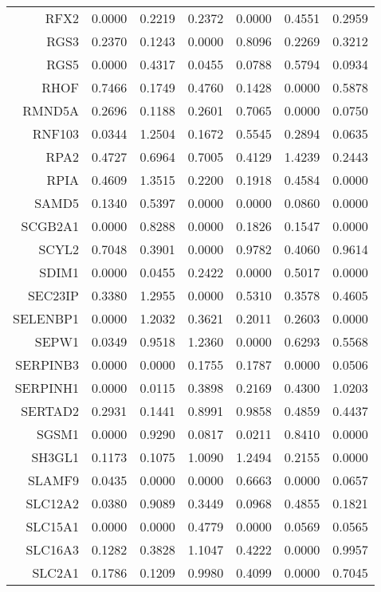 \begin{longtable}{rrrrrrr}
  RFX2 & 0.0000 & 0.2219 & 0.2372 & 0.0000 & 0.4551 & 0.2959 \\ 
  RGS3 & 0.2370 & 0.1243 & 0.0000 & 0.8096 & 0.2269 & 0.3212 \\ 
  RGS5 & 0.0000 & 0.4317 & 0.0455 & 0.0788 & 0.5794 & 0.0934 \\ 
  RHOF & 0.7466 & 0.1749 & 0.4760 & 0.1428 & 0.0000 & 0.5878 \\ 
  RMND5A & 0.2696 & 0.1188 & 0.2601 & 0.7065 & 0.0000 & 0.0750 \\ 
  RNF103 & 0.0344 & 1.2504 & 0.1672 & 0.5545 & 0.2894 & 0.0635 \\ 
  RPA2 & 0.4727 & 0.6964 & 0.7005 & 0.4129 & 1.4239 & 0.2443 \\ 
  RPIA & 0.4609 & 1.3515 & 0.2200 & 0.1918 & 0.4584 & 0.0000 \\ 
  SAMD5 & 0.1340 & 0.5397 & 0.0000 & 0.0000 & 0.0860 & 0.0000 \\ 
  SCGB2A1 & 0.0000 & 0.8288 & 0.0000 & 0.1826 & 0.1547 & 0.0000 \\ 
  SCYL2 & 0.7048 & 0.3901 & 0.0000 & 0.9782 & 0.4060 & 0.9614 \\ 
  SDIM1 & 0.0000 & 0.0455 & 0.2422 & 0.0000 & 0.5017 & 0.0000 \\ 
  SEC23IP & 0.3380 & 1.2955 & 0.0000 & 0.5310 & 0.3578 & 0.4605 \\ 
  SELENBP1 & 0.0000 & 1.2032 & 0.3621 & 0.2011 & 0.2603 & 0.0000 \\ 
  SEPW1 & 0.0349 & 0.9518 & 1.2360 & 0.0000 & 0.6293 & 0.5568 \\ 
  SERPINB3 & 0.0000 & 0.0000 & 0.1755 & 0.1787 & 0.0000 & 0.0506 \\ 
  SERPINH1 & 0.0000 & 0.0115 & 0.3898 & 0.2169 & 0.4300 & 1.0203 \\ 
  SERTAD2 & 0.2931 & 0.1441 & 0.8991 & 0.9858 & 0.4859 & 0.4437 \\ 
  SGSM1 & 0.0000 & 0.9290 & 0.0817 & 0.0211 & 0.8410 & 0.0000 \\ 
  SH3GL1 & 0.1173 & 0.1075 & 1.0090 & 1.2494 & 0.2155 & 0.0000 \\ 
  SLAMF9 & 0.0435 & 0.0000 & 0.0000 & 0.6663 & 0.0000 & 0.0657 \\ 
  SLC12A2 & 0.0380 & 0.9089 & 0.3449 & 0.0968 & 0.4855 & 0.1821 \\ 
  SLC15A1 & 0.0000 & 0.0000 & 0.4779 & 0.0000 & 0.0569 & 0.0565 \\ 
  SLC16A3 & 0.1282 & 0.3828 & 1.1047 & 0.4222 & 0.0000 & 0.9957 \\ 
  SLC2A1 & 0.1786 & 0.1209 & 0.9980 & 0.4099 & 0.0000 & 0.7045 \\ 

\end{longtable}
